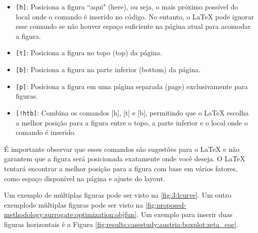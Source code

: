 		\begin{itemize}
			\item \verb|[h]|: Posiciona a figura ``aqui" (here), ou seja, o mais próximo possível do local onde o comando é inserido no código. No entanto, o LaTeX pode ignorar esse comando se não houver espaço suficiente na página atual para acomodar a figura.
			\item \verb|[t]|: Posiciona a figura no topo (top) da página.
			\item \verb|[b]|: Posiciona a figura na parte inferior (bottom) da página.
			\item \verb|[p]|: Posiciona a figura em uma página separada (page) exclusivamente para figuras.
			\item \verb|[!htb]|: Combina os comandos [h], [t] e [b], permitindo que o LaTeX escolha a melhor posição para a figura entre o topo, a parte inferior e o local onde o comando é inserido.
		\end{itemize}

		É importante observar que esses comandos são sugestões para o LaTeX e não garantem que a figura será posicionada exatamente onde você deseja. O LaTeX tentará encontrar a melhor posição para a figura com base em vários fatores, como espaço disponível na página e ajuste do layout.

		Um exemplo de múltiplas figuras pode ser visto na \autoref{fig:3:lcurve}. Um outro exemplode múltiplas figuras pode ser visto na \autoref{fig:proposed-methodology:surrogate:optimization:objfun}. Um exemplo para inserir duas figuras horizontais é a Figura \ref{fig:results:casestudy:austria:boxplot:zeta_eoe}.

